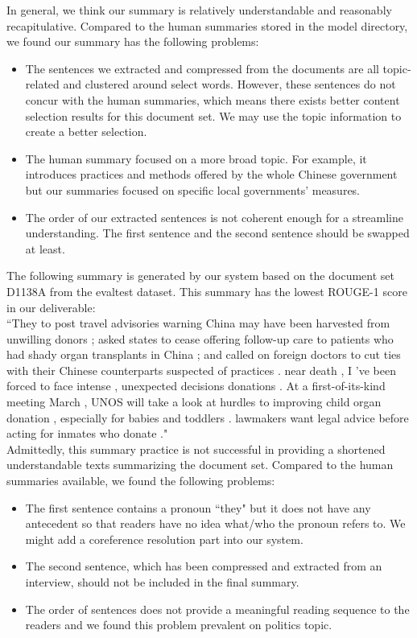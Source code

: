 \documentclass[11pt]{article}
\begin{document}
In general, we think our summary is relatively understandable and reasonably recapitulative. Compared to the human summaries stored in the model directory, we found our summary has the following problems:
\begin{itemize}  
\item The sentences we extracted and compressed from the documents are all topic-related and clustered around select words. However, these sentences do not concur with the human summaries, which means there exists better content selection results for this document set. We may use the topic information to create a better selection.
\item The human summary focused on a more broad topic. For example, it introduces practices and methods offered by the whole Chinese government but our summaries focused on specific local governments' measures.
\item The order of our extracted sentences is not coherent enough for a streamline understanding. The first sentence and the second sentence should be swapped at least.
\end{itemize}

The following summary is generated by our system based on the document set D1138A from the evaltest dataset. This summary has the lowest ROUGE-1 score in our deliverable:\\

``They to post travel advisories warning China may have been harvested from unwilling donors ; asked states to cease offering follow-up care to patients who had shady organ transplants in China ; and called on foreign doctors to cut ties with their Chinese counterparts suspected of practices .
near death , I 've been forced to face intense , unexpected decisions donations .
At a first-of-its-kind meeting March , UNOS will take a look at hurdles to improving child organ donation , especially for babies and toddlers .
lawmakers want legal advice before acting for inmates who donate ."\\

Admittedly, this summary practice is not successful in providing a shortened understandable texts summarizing the document set. Compared to the human summaries available, we found the following problems:
\begin{itemize}
\item The first sentence contains a pronoun ``they" but it does not have any antecedent so that readers have no idea what/who the pronoun refers to. We might add a coreference resolution part into our system.
\item The second sentence, which has been compressed and extracted from an interview, should not be included in the final summary.
\item The order of sentences does not provide a meaningful reading sequence to the readers and we found this problem prevalent on politics topic.
\end{itemize}
\end{document}
